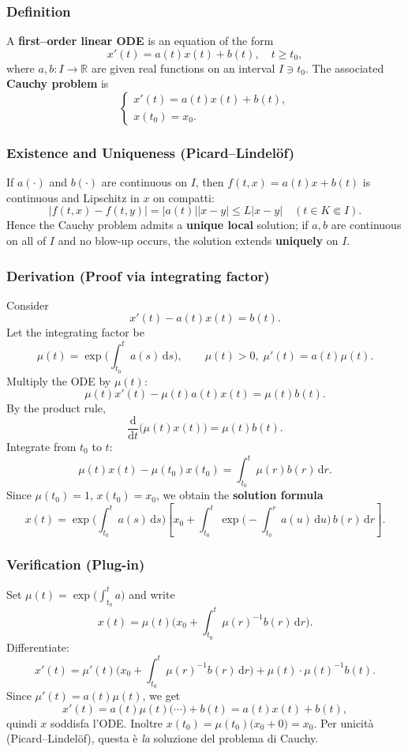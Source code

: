 \documentclass[12pt,a4paper]{book}
\theoremstyle{remark}
\newcommand{\RR}{\mathbb{R}}
\newcommand{\dd}{\mathrm{d}}
\begin{document}
\subsubsection*{Definition}
A \textbf{first–order linear ODE} is an equation of the form
\[
x'(t) = a(t)x(t) + b(t), \quad t \ge t_0,
\]
where $a,b:I\to\RR$ are given real functions on an interval $I\ni t_0$. The associated \textbf{Cauchy problem} is
\[
\begin{cases}
x'(t) = a(t)x(t) + b(t),\\
x(t_0)=x_0.
\end{cases}
\]

\subsubsection*{Existence and Uniqueness (Picard–Lindel\"of)}
If $a(\cdot)$ and $b(\cdot)$ are continuous on $I$, then $f(t,x)=a(t)x+b(t)$ is continuous and Lipschitz in $x$ on compatti: 
\[
|f(t,x)-f(t,y)|=|a(t)||x-y| \le L|x-y| \quad (t\in K\Subset I).
\]
Hence the Cauchy problem admits a \textbf{unique local} solution; if $a,b$ are continuous on all of $I$ and no blow-up occurs, the solution extends \textbf{uniquely} on $I$.

\subsubsection*{Derivation (Proof via integrating factor)}
Consider
\[
x'(t)-a(t)x(t)=b(t).
\]
Let the integrating factor be
\[
\mu(t)=\exp\!\Big(\int_{t_0}^t a(s)\,\dd s\Big),\qquad \mu(t)>0,\;\mu'(t)=a(t)\mu(t).
\]
Multiply the ODE by $\mu(t)$:
\[
\mu(t)x'(t)-\mu(t)a(t)x(t)=\mu(t)b(t).
\]
By the product rule,
\[
\frac{\dd}{\dd t}\big(\mu(t)x(t)\big)=\mu(t)b(t).
\]
Integrate from $t_0$ to $t$:
\[
\mu(t)x(t)-\mu(t_0)x(t_0)=\int_{t_0}^t \mu(r)b(r)\,\dd r.
\]
Since $\mu(t_0)=1$, $x(t_0)=x_0$, we obtain the \textbf{solution formula}
\[
\boxed{\;
x(t)=\exp\!\Big(\int_{t_0}^t a(s)\,\dd s\Big)\left[
x_0+\int_{t_0}^t \exp\!\Big(-\int_{t_0}^r a(u)\,\dd u\Big)\,b(r)\,\dd r
\right].\;}
\]

\subsubsection*{Verification (Plug-in)}
Set $\mu(t)=\exp\!\big(\int_{t_0}^t a\big)$ and write
\[
x(t)=\mu(t)\Big(x_0+\int_{t_0}^t \mu(r)^{-1}b(r)\,\dd r\Big).
\]
Differentiate:
\[
x'(t)=\mu'(t)\Big(x_0+\int_{t_0}^t \mu(r)^{-1}b(r)\,\dd r\Big)+\mu(t)\cdot \mu(t)^{-1}b(t).
\]
Since $\mu'(t)=a(t)\mu(t)$, we get
\[
x'(t)=a(t)\mu(t)\Big(\cdots\Big)+b(t)=a(t)x(t)+b(t),
\]
quindi $x$ soddisfa l’ODE. Inoltre $x(t_0)=\mu(t_0)\big(x_0+0\big)=x_0$. Per unicità (Picard–Lindel\"of), questa è \emph{la} soluzione del problema di Cauchy.
\end{document}
